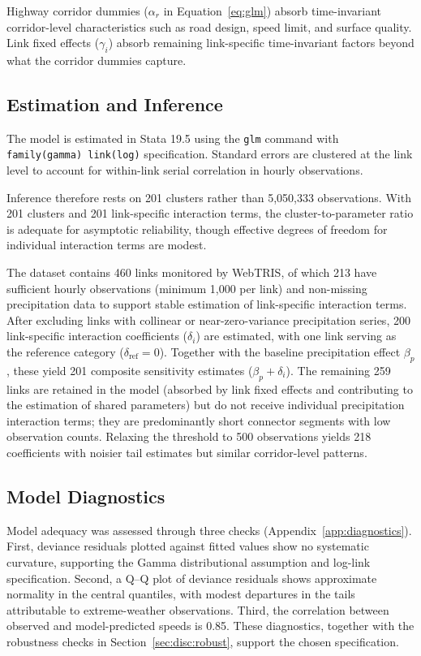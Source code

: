 \documentclass[review,authoryear]{elsarticle}
\begin{document}
\noindent Highway corridor dummies ($\alpha_r$ in Equation~\ref{eq:glm}) absorb time-invariant corridor-level characteristics such as road design, speed limit, and surface quality. Link fixed effects ($\gamma_i$) absorb remaining link-specific time-invariant factors beyond what the corridor dummies capture.

\subsection{Estimation and Inference}
\label{sec:method:estimation}

The model is estimated in Stata 19.5 using the \texttt{glm} command with \texttt{family(gamma) link(log)} specification. Standard errors are clustered at the link level to account for within-link serial correlation in hourly observations.

Inference therefore rests on 201 clusters rather than 5,050,333 observations. With 201 clusters and 201 link-specific interaction terms, the cluster-to-parameter ratio is adequate for asymptotic reliability, though effective degrees of freedom for individual interaction terms are modest.

The dataset contains 460 links monitored by WebTRIS, of which 213 have sufficient hourly observations (minimum 1{,}000 per link) and non-missing precipitation data to support stable estimation of link-specific interaction terms. After excluding links with collinear or near-zero-variance precipitation series, 200 link-specific interaction coefficients ($\delta_i$) are estimated, with one link serving as the reference category ($\delta_{\text{ref}} = 0$). Together with the baseline precipitation effect $\beta_p$, these yield 201 composite sensitivity estimates ($\beta_p + \delta_i$). The remaining 259 links are retained in the model (absorbed by link fixed effects and contributing to the estimation of shared parameters) but do not receive individual precipitation interaction terms; they are predominantly short connector segments with low observation counts. Relaxing the threshold to 500 observations yields 218 coefficients with noisier tail estimates but similar corridor-level patterns.

\subsection{Model Diagnostics}
\label{sec:method:diagnostics}

Model adequacy was assessed through three checks (Appendix~\ref{app:diagnostics}). First, deviance residuals plotted against fitted values show no systematic curvature, supporting the Gamma distributional assumption and log-link specification. Second, a Q--Q plot of deviance residuals shows approximate normality in the central quantiles, with modest departures in the tails attributable to extreme-weather observations. Third, the correlation between observed and model-predicted speeds is 0.85. These diagnostics, together with the robustness checks in Section~\ref{sec:disc:robust}, support the chosen specification.
\end{document}
